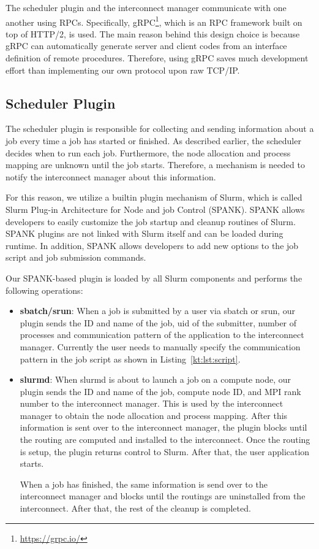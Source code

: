 \documentclass[graybox]{svmult}
\begin{document}
The scheduler plugin and the interconnect manager communicate with
one another using RPCs. Specifically, gRPC\footnote{\url{https://grpc.io/}}, which is an
RPC framework built on top of HTTP/2, is used. The main reason behind this
design choice is because gRPC can automatically generate server and client
codes from an interface definition of remote procedures. Therefore, using gRPC
saves much development effort than implementing our own protocol upon raw
TCP/IP\@.

\subsection{Scheduler Plugin}

The scheduler plugin is responsible for collecting and sending information
about a job every time a job has started or finished. As described earlier,
the scheduler decides when to run each job. Furthermore, the node allocation
and process mapping are unknown until the job starts. Therefore, a mechanism
is needed to notify the interconnect manager about this information.

For this reason, we utilize a builtin plugin mechanism of Slurm, which is
called Slurm Plug-in Architecture for Node and job Control (SPANK). SPANK
allows developers to easily customize the job startup and cleanup routines of
Slurm. SPANK plugins are not linked with Slurm itself and can be loaded during
runtime. In addition, SPANK allows developers to add new options to the job
script and job submission commands.

Our SPANK-based plugin is loaded by all Slurm components and performs the
following operations:

\begin{itemize}
    \item \textbf{sbatch/srun}: When a job is submitted by a user via sbatch
        or srun, our plugin sends the ID and name of the job, uid of the
        submitter, number of processes and communication pattern of the
        application to the interconnect manager. Currently the user
        needs to manually specify the communication pattern in the job script
        as shown in Listing~\ref{kt:lst:script}.
    \item \textbf{slurmd}: When slurmd is about to launch a job on a compute
        node, our plugin sends the ID and name of the job, compute node ID,
        and MPI rank number to the interconnect manager. This is used by the
        interconnect manager to obtain the node allocation and process
        mapping. After this information is sent over to the interconnect
        manager, the plugin blocks until the routing are computed and
        installed to the interconnect. Once the routing is setup, the plugin
        returns control to Slurm. After that, the user application starts.

        When a job has finished, the same information is send over to the
        interconnect manager and blocks until the routings are uninstalled
        from the interconnect. After that, the rest of the cleanup is
        completed.
\end{itemize}
\end{document}
